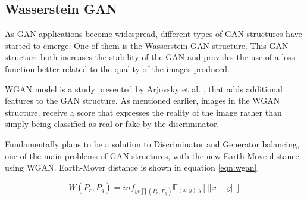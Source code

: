 \subsection{Wasserstein GAN}

As GAN applications become widespread, different types of GAN structures have started to emerge. One of them is the Wasserstein GAN structure. This GAN structure both increases the stability of the GAN and provides the use of a loss function better related to the quality of the images produced.

WGAN model is a study presented by Arjovsky et al. \cite{wgan}, that adds additional features to the GAN structure. As mentioned earlier, images in the WGAN structure, receive a score that expresses the reality of the image rather than simply being classified as real or fake by the discriminator.

Fundamentally plans to be a solution to Discriminator and Generator balancing, one of the main problems of GAN structures, with the new Earth Move distance using WGAN. Earth-Mover distance is shown in equation \ref{eqn:wgan}.

\begin{equation}
\label{eqn:wgan}
    W(P_r, P_g)= {inf}_{y\epsilon\prod (P_r,P_g)}\mathbb{E}_{(x,y)~y}[||x-y||]
\end{equation}
